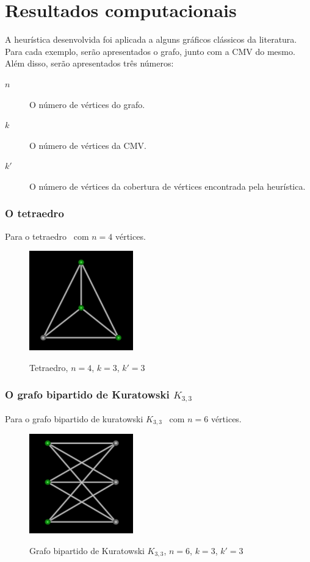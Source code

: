 \part{Resultados computacionais}
\label{sec:resultados}

A heurística desenvolvida foi aplicada a alguns gráficos clássicos da
literatura. Para cada exemplo, serão apresentados o grafo, junto com a
CMV do mesmo. Além disso, serão apresentados três números:
\begin{description}
    \item[$n$] O número de vértices do grafo.
    \item[$k$] O número de vértices da CMV.
    \item[$k'$] O número de vértices da cobertura de vértices
    encontrada pela heurística.
\end{description}

\section{O tetraedro}
Para o tetraedro~\cite{cite:example-plato} com $n=4$ vértices.

\begin{figure}[htb]
\centering
\includegraphics[width=0.4\textwidth]{img/tetraedro.png}
\label{fig:example-tetraedro}
\caption{Tetraedro, $n=4$, $k=3$, $k'=3$}
\end{figure}

\section{O grafo bipartido de Kuratowski $K_{3,3}$}
Para o grafo bipartido de kuratowski
$K_{3,3}$~\cite{cite:example-kuratowski} com $n=6$ vértices.

\begin{figure}[htb]
\centering
\includegraphics[width=0.4\textwidth]{img/kuratowski.png}
\label{fig:example-kuratowski}
\caption{Grafo bipartido de Kuratowski $K_{3,3}$, $n=6$, $k=3$, $k'=3$}
\end{figure}


